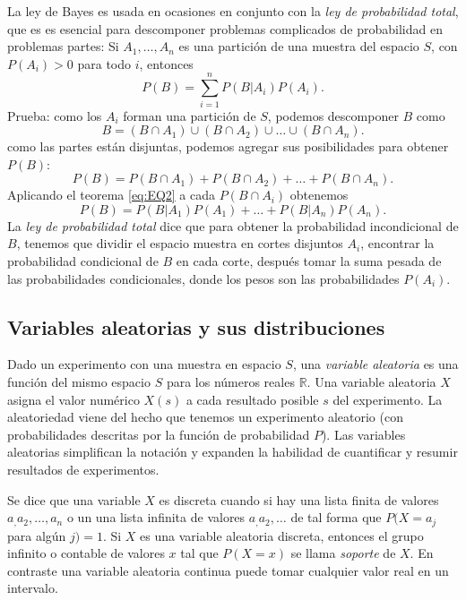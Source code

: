 \documentclass[12pt,letterpaper]{article}
\begin{document}
La ley de Bayes es usada en ocasiones en conjunto con la \emph{ley de probabilidad total}, que es es esencial para descomponer problemas complicados de probabilidad en problemas partes: Si $A_1,\ldots,A_n$ es una partición de una muestra del espacio $S$, con $P(A_i)>0$ para todo $i$, entonces
\begin{equation}
P(B)=\sum_{i=1}^{n}P(B|A_i)P(A_i).
\end{equation}
Prueba: como los $A_i$ forman una partición de $S$, podemos descomponer $B$ como
\begin{equation}
B=(B\cap A_1)\cup(B\cap A_2)\cup\ldots\cup(B\cap A_n).
\end{equation}
como las partes están disjuntas, podemos agregar sus posibilidades para obtener $P(B)$:
\begin{equation}
P(B)=P(B\cap A_1)+P(B\cap A_2)+\ldots+P(B\cap A_n).
\end{equation}
Aplicando el teorema \eqref{eq:EQ2} a cada $P(B\cap A_i)$ obtenemos
\begin{equation}
P(B)=P(B|A_1)P(A_1)+\ldots+P(B|A_n)P(A_n).
\end{equation}
La \emph{ley de probabilidad total} dice que para obtener la probabilidad incondicional de $B$, tenemos que dividir el espacio muestra en cortes disjuntos $A_i$, encontrar la probabilidad condicional de $B$ en cada corte, después tomar la suma pesada de las probabilidades condicionales, donde los pesos son las probabilidades $P(A_i)$.
\subsection {Variables aleatorias y sus distribuciones}
Dado un experimento con una muestra en espacio $S$, una \emph{variable aleatoria} es una función del mismo espacio $S$ para los números reales $\mathbb{R}$. Una variable aleatoria $X$ asigna el valor numérico $X(s)$ a cada resultado posible $s$ del experimento. La aleatoriedad viene del hecho que tenemos un experimento aleatorio (con probabilidades descritas por la función de probabilidad $P$). Las variables aleatorias simplifican la notación y expanden la habilidad de cuantificar y resumir resultados de experimentos.

Se dice que una variable $X$ es discreta cuando si hay una lista finita de valores $a_,a_2,\ldots,a_n$ o un una lista infinita de valores $a_,a_2,\ldots$ de tal forma que $P(X=a_j$ para algún $j)=1$. Si $X$ es una variable aleatoria discreta, entonces el grupo infinito o contable de valores $x$ tal que $P(X=x)$ se llama \emph{soporte} de $X$. En contraste una variable aleatoria continua puede tomar cualquier valor real en un intervalo.
\end{document}

